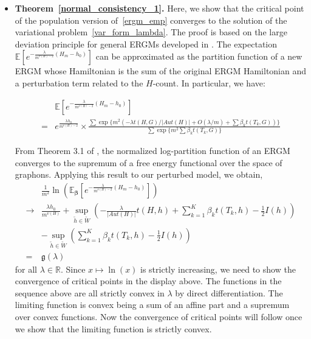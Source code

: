 \documentclass[12pt]{article}
\def\E{\mathbb{E}}
\numberwithin{equation}{section}
\def\bbeta{\boldsymbol{\beta}}
\begin{document}
\begin{itemize}
    \item \textbf{Theorem~\ref{normal_consistency_1}.} Here, we show that the critical point of the population version
    of~\eqref{ergm_emp} converges to the solution of the variational problem~\eqref{var_form_lambda}.
The proof is based on the large deviation principle for general ERGMs developed in \cite{chatterjee2013estimating}. The expectation $\E[e^{-\frac{\lambda}{m^{v(H)-2}}(H_m-h_0)}]$ can be approximated as the partition function of a new ERGM whose Hamiltonian is the sum of the original ERGM Hamiltonian and a perturbation term related to the $H$-count. In particular, we have:

\begin{align*}
&\E\left[e^{-\frac{\lambda}{m^{v(H)-2}}(H_m-h_0)}\right]\\ = &e^{\frac{\lambda h_0}{m^{v(H)-2}}}\times\frac{\sum \exp\{m^2(-\lambda t(H,G)/\lvert Aut(H)\rvert + O(\lambda/m) + \sum \beta_kt(T_k,G))\}}{\sum \exp\{m^2\sum \beta_kt(T_k,G)\}}
\end{align*}

From Theorem 3.1 of \cite{chatterjee2013estimating}, the normalized log-partition function of an ERGM converges to the supremum of a free energy functional over the space of graphons. Applying this result to our perturbed model, we obtain,
\begin{align}
&\frac{1}{m^2}\ln \left(\E_{\bbeta}\left[e^{-\frac{\lambda}{m^{v(H)-2}}(H_m-h_0)}\right]\right)\nonumber\\
\to & \frac{\lambda h_0}{m^{v(H)}} + \sup_{\tilde{h}\in\tilde{W}}\left(-\frac{\lambda}{|Aut(H)|} t(H,h) + \sum_{k=1}^K \beta_k t(T_k, h) - \frac{1}{2}I(h) \right)\nonumber\\
&- \sup_{\tilde{h}\in\tilde{W}}\left(\sum_{k=1}^K \beta_k t(T_k, h) - \frac{1}{2}I(h) \right)\nonumber\nonumber\\
=& \mathfrak{g}(\lambda)\label{var_formula}
\end{align}
for all $\lambda \in \mathbb{R}$.
Since $x\mapsto \ln(x)$ is strictly increasing, we need to show the convergence of critical points in the display above. The functions in the sequence above are all strictly convex in $\lambda$ by direct differentiation. The limiting function is convex being a sum of an affine part and a supremum over convex functions. Now the convergence of critical points will follow once we show that the limiting function is strictly convex. \\
    

\end{itemize}
\end{document}

